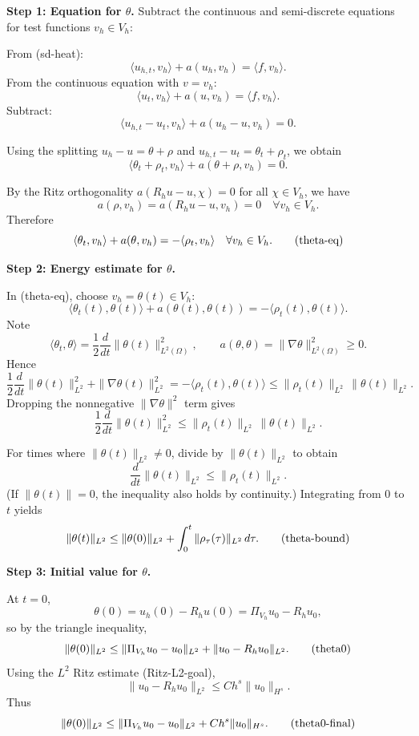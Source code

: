 \textbf{Step 1: Equation for $\theta$.}
Subtract the continuous and semi-discrete equations for test functions $v_h\in V_h$:

From (sd-heat):
\[
    \langle u_{h,t},v_h\rangle + a(u_h,v_h) = \langle f,v_h\rangle.
\]
From the continuous equation with $v=v_h$:
\[
    \langle u_t,v_h\rangle + a(u,v_h) = \langle f,v_h\rangle.
\]
Subtract:
\[
    \langle u_{h,t} - u_t, v_h\rangle + a(u_h - u, v_h) = 0.
\]

Using the splitting $u_h - u = \theta + \rho$ and $u_{h,t} - u_t = \theta_t + \rho_t$, we obtain
\[
    \langle \theta_t + \rho_t, v_h\rangle + a(\theta + \rho, v_h) = 0.
\]

By the Ritz orthogonality $a(R_h u - u,\chi)=0$ for all $\chi\in V_h$, we have
\[
    a(\rho,v_h) = a(R_h u - u,v_h) = 0\quad\forall v_h\in V_h.
\]
Therefore
\[
    \langle \theta_t,v_h\rangle + a(\theta,v_h)
    = -\langle \rho_t,v_h\rangle \quad\forall v_h\in V_h.\tag{\text{theta-eq}}
\]

\textbf{Step 2: Energy estimate for $\theta$.}

In (theta-eq), choose $v_h = \theta(t)\in V_h$:
\[
    \langle \theta_t(t),\theta(t)\rangle + a(\theta(t),\theta(t))
    = -\langle \rho_t(t),\theta(t)\rangle.
\]
Note
\[
    \langle \theta_t,\theta\rangle = \frac12 \frac{d}{dt}\|\theta(t)\|_{L^2(\Omega)}^2,
    \qquad
    a(\theta,\theta) = \|\nabla\theta\|_{L^2(\Omega)}^2 \ge 0.
\]
Hence
\[
    \frac12\frac{d}{dt}\|\theta(t)\|_{L^2}^2 + \|\nabla\theta(t)\|_{L^2}^2
    = -\langle \rho_t(t),\theta(t)\rangle
    \le \|\rho_t(t)\|_{L^2}\,\|\theta(t)\|_{L^2}.
\]
Dropping the nonnegative $\|\nabla\theta\|^2$ term gives
\[
    \frac12\frac{d}{dt}\|\theta(t)\|_{L^2}^2
    \le \|\rho_t(t)\|_{L^2}\,\|\theta(t)\|_{L^2}.
\]

For times where $\|\theta(t)\|_{L^2}\neq 0$, divide by $\|\theta(t)\|_{L^2}$ to obtain
\[
    \frac{d}{dt}\|\theta(t)\|_{L^2}
    \le \|\rho_t(t)\|_{L^2}.
\]
(If $\|\theta(t)\|=0$, the inequality also holds by continuity.)
Integrating from $0$ to $t$ yields
\[
    \|\theta(t)\|_{L^2}
    \le \|\theta(0)\|_{L^2} + \int_0^t \|\rho_\tau(\tau)\|_{L^2}\,d\tau.\tag{\text{theta-bound}}
\]

\textbf{Step 3: Initial value for $\theta$.}

At $t=0$,
\[
    \theta(0) = u_h(0) - R_h u(0) = \Pi_{V_h}u_0 - R_h u_0,
\]
so by the triangle inequality,
\[
    \|\theta(0)\|_{L^2}
    \le \|\Pi_{V_h}u_0 - u_0\|_{L^2}
    + \|u_0 - R_h u_0\|_{L^2}. \tag{\text{theta0}}
\]
Using the $L^2$ Ritz estimate (Ritz-L2-goal),
\[
    \|u_0 - R_h u_0\|_{L^2} \le C h^s \|u_0\|_{H^s}.
\]
Thus
\[
    \|\theta(0)\|_{L^2}
    \le \|\Pi_{V_h}u_0 - u_0\|_{L^2}
    + C h^s \|u_0\|_{H^s}.\tag{\text{theta0-final}}
\]

